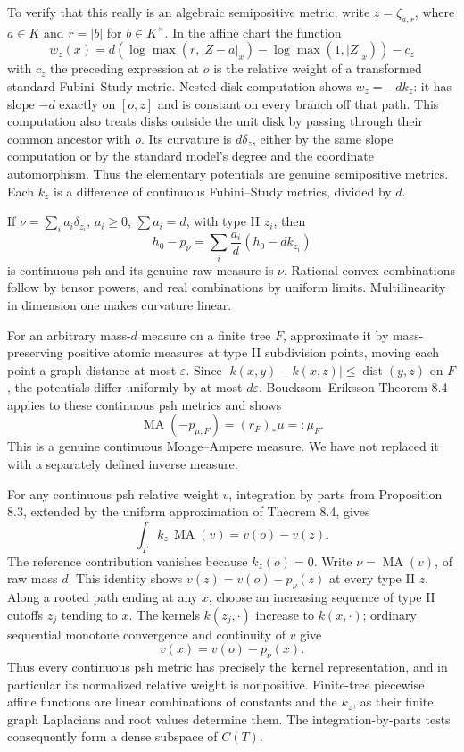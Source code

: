 \documentclass[
  11pt,
]{article}
\begin{document}
To verify that this really is an algebraic semipositive metric, write
\(z=\zeta_{a,r}\), where \(a\in K\) and \(r=|b|\) for \(b\in K^\times\).
In the affine chart the function \[
w_z(x)=d\left(\log\max(r,|Z-a|_x)-\log\max(1,|Z|_x)\right)-c_z
\] with \(c_z\) the preceding expression at \(o\) is the relative weight
of a transformed standard Fubini--Study metric. Nested disk computation
shows \(w_z=-dk_z\): it has slope \(-d\) exactly on \([o,z]\) and is
constant on every branch off that path. This computation also treats
disks outside the unit disk by passing through their common ancestor
with \(o\). Its curvature is \(d\delta_z\), either by the same slope
computation or by the standard model's degree and the coordinate
automorphism. Thus the elementary potentials are genuine semipositive
metrics. Each \(k_z\) is a difference of continuous Fubini--Study
metrics, divided by \(d\).

If \(\nu=\sum_i a_i\delta_{z_i}\), \(a_i\geq0\), \(\sum a_i=d\), with
type II \(z_i\), then \[
h_0-p_\nu=\sum_i\frac{a_i}{d}(h_0-dk_{z_i})
\] is continuous psh and its genuine raw measure is \(\nu\). Rational
convex combinations follow by tensor powers, and real combinations by
uniform limits. Multilinearity in dimension one makes curvature linear.

For an arbitrary mass-\(d\) measure on a finite tree \(F\), approximate
it by mass-preserving positive atomic measures at type II subdivision
points, moving each point a graph distance at most \(\varepsilon\).
Since \(|k(x,y)-k(x,z)|\leq\operatorname{dist}(y,z)\) on \(F\), the
potentials differ uniformly by at most \(d\varepsilon\).
Boucksom--Eriksson Theorem 8.4 applies to these continuous psh metrics
and shows \[
\operatorname{MA}(-p_{\mu,F})=(r_F)_*\mu=:\mu_F.
\] This is a genuine continuous Monge--Ampere measure. We have not
replaced it with a separately defined inverse measure.

For any continuous psh relative weight \(v\), integration by parts from
Proposition 8.3, extended by the uniform approximation of Theorem 8.4,
gives \[
\int_T k_z\,\operatorname{MA}(v)=v(o)-v(z).
\] The reference contribution vanishes because \(k_z(o)=0\). Write
\(\nu=\operatorname{MA}(v)\), of raw mass \(d\). This identity shows
\(v(z)=v(o)-p_\nu(z)\) at every type II \(z\). Along a rooted path
ending at any \(x\), choose an increasing sequence of type II cutoffs
\(z_j\) tending to \(x\). The kernels \(k(z_j,\cdot)\) increase to
\(k(x,\cdot)\); ordinary sequential monotone convergence and continuity
of \(v\) give \[
v(x)=v(o)-p_\nu(x).
\] Thus every continuous psh metric has precisely the kernel
representation, and in particular its normalized relative weight is
nonpositive. Finite-tree piecewise affine functions are linear
combinations of constants and the \(k_z\), as their finite graph
Laplacians and root values determine them. The integration-by-parts
tests consequently form a dense subspace of \(C(T)\).
\end{document}
